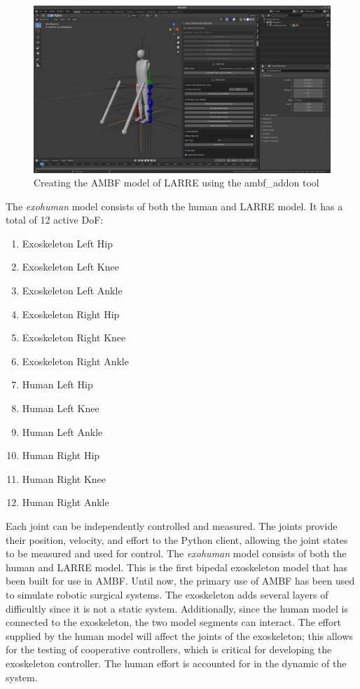  \begin{figure}[h]
     \centering
     \includegraphics[scale=0.2]{images/sim/blender.png}
     \caption[Blender Model of LARRE]{Creating the AMBF model of LARRE using the ambf\_addon tool}
     \label{fig:blender}
 \end{figure}
 
 
 The \textit{exohuman} model consists of both the human and LARRE model. It has a total of 12 active DoF:

\begin{enumerate}
  \item Exoskeleton Left Hip
  \item Exoskeleton Left Knee
  \item Exoskeleton Left Ankle
  \item Exoskeleton Right Hip
  \item Exoskeleton Right Knee
  \item Exoskeleton Right Ankle
  \item Human Left Hip
  \item Human Left Knee
  \item Human Left Ankle
  \item Human Right Hip
  \item Human Right Knee
  \item Human Right Ankle
\end{enumerate}

 
 Each joint can be independently controlled and measured. The joints provide their position, velocity, and effort to the Python client, allowing the joint states to be measured and used for control. The \textit{exohuman} model consists of both the human and LARRE model. This is the first bipedal exoskeleton model that has been built for use in AMBF. Until now, the primary use of AMBF has been used to simulate robotic surgical systems. The exoskeleton adds several layers of difficultly since it is not a static system. Additionally, since the human model is connected to the exoskeleton, the two model segments can interact. The effort supplied by the human model will affect the joints of the exoskeleton; this allows for the testing of cooperative controllers, which is critical for developing the exoskeleton controller. The human effort is accounted for in the dynamic of the system.  
 

